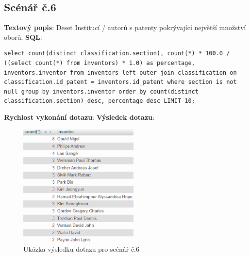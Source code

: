 \subsection{Scénář č.6}
\textbf{Textový popis}: Deset Institucí / autorů s patenty pokrývající největší množství oborů.
\newline
\textbf{SQL}: 
\begin{lstlisting}[label = {lst:elements_a}]
select count(distinct classification.section), count(*) * 100.0 / ((select count(*) from inventors) * 1.0) as percentage, inventors.inventor from inventors left outer join classification on classification.id_patent = inventors.id_patent where section is not null group by inventors.inventor order by count(distinct classification.section) desc, percentage desc LIMIT 10;
\end{lstlisting}
\textbf{Rychlost vykonání dotazu}: 
\newline
\textbf{Výsledek dotazu}:
\begin{figure}[H]
\centering
\includegraphics[width=6cm]{img/scenare/scenar_9}
\caption{Ukázka výsledku dotazu pro scénář č.6}
\label{fig:scenar6}
\end{figure}

